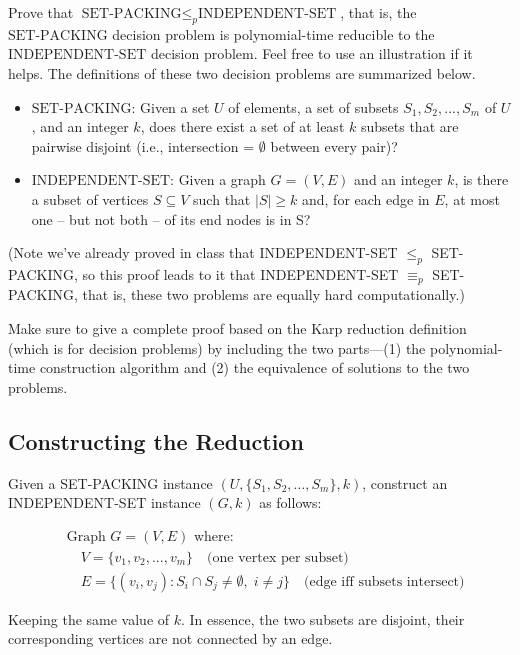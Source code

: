 \documentclass[12pt]{article}
\begin{document}
Prove that $\text{SET-PACKING} \leq_{p} \text{INDEPENDENT-SET}$, that is, the $\text{SET-PACKING}$ decision problem is polynomial-time reducible to the $\text{INDEPENDENT-SET}$ decision problem. Feel free to use an illustration if it helps. The definitions of these two decision problems are summarized below.

\begin{itemize}
\item $\text{SET-PACKING}$: Given a set $U$ of elements, a set of subsets $S_{1}, S_{2}, ..., S_{m}$ of $U$, and an integer $k$, does there exist a set of at least $k$ subsets that are pairwise disjoint (i.e., intersection = $\emptyset$ between every pair)?
\item $\text{INDEPENDENT-SET}$: Given a graph $G = (V, E)$ and an integer $k$, is there a subset of vertices $S \subseteq V$ such that $|S| \geq k$ and, for each edge in $E$, at most one -- but not both -- of its end nodes is in S?
\end{itemize}

(Note we've already proved in class that INDEPENDENT-SET $\leq_{p}$ SET-PACKING, so this proof leads to it that INDEPENDENT-SET $\equiv_{p}$ SET-PACKING, that is, these two problems are equally hard computationally.)

Make sure to give a complete proof based on the Karp reduction definition (which is for decision problems) by including the two parts---(1) the polynomial-time construction algorithm and (2) the equivalence of solutions to the two problems.

\subsection{Constructing the Reduction}

Given a SET-PACKING instance $(U, \{ S_{1},S_{2},\dots,S_{m}\}, k)$, construct an INDEPENDENT-SET instance $(G,k)$ as follows:

\begin{align}
&\text{Graph } G = (V, E) \text{ where:}\\
&\quad V = \{v_1, v_2, ..., v_m\} \quad \text{(one vertex per subset)}\\
&\quad E = \{(v_i, v_j) : S_i \cap S_j \neq \emptyset, \; i \neq j\} \quad \text{(edge iff subsets intersect)}
\end{align}

Keeping the same value of $k$. In essence, the two subsets are disjoint, their corresponding vertices are not connected by an edge.
\end{document}
